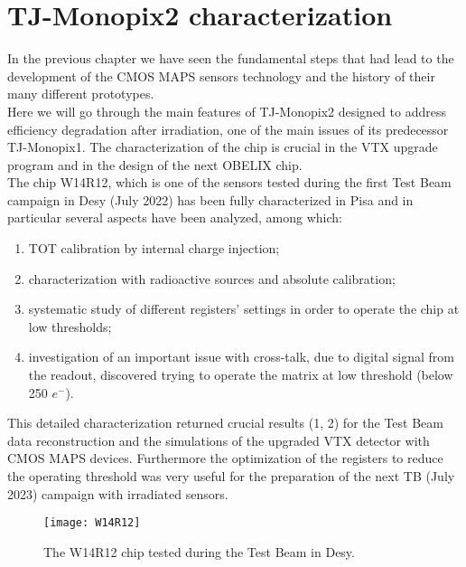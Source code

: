
\chapter{TJ-Monopix2 characterization} \label{ch:TJ2}

In the previous chapter we have seen the fundamental steps that had lead to the development of the CMOS MAPS sensors technology and the history of their many different prototypes. \\
Here we will go through the main features of TJ-Monopix2 designed to address efficiency degradation after irradiation, one of the main issues of its predecessor TJ-Monopix1. The characterization of the chip is crucial in the VTX upgrade program and in the design of the next OBELIX chip.\\
The chip W14R12, which is one of the sensors tested during the first Test Beam campaign in Desy (July 2022) has been fully characterized in Pisa and in particular several aspects have been analyzed, among which:

\begin{enumerate}
\item TOT calibration by internal charge injection;
\item characterization with radioactive sources and absolute calibration;
\item systematic study of different registers' settings in order to operate the chip at low thresholds;
\item investigation of an important issue with cross-talk, due to digital signal from the readout, discovered trying to operate the matrix at low threshold (below 250 $e^{-}$).
\end{enumerate}

This detailed characterization returned crucial results (1, 2) for the Test Beam data reconstruction and the simulations of the upgraded VTX detector with CMOS MAPS devices. Furthermore the optimization of the registers to reduce the operating threshold was very useful for the preparation of the next TB (July 2023) campaign with irradiated sensors.


\begin{figure}[h!]
\centering
\texttt{[image: W14R12]}
\caption{The W14R12 chip tested during the Test Beam in Desy.}
\label{fig:w14r12}
\end{figure}


